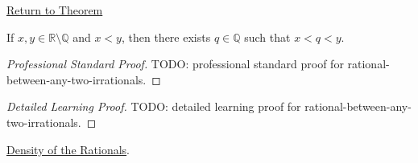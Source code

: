 \newpage
{}
\label{prf:rational-between-any-two-irrationals}

\begin{remark*}[Return]
\hyperref[thm:rational-between-any-two-irrationals]{Return to Theorem}
\end{remark*}

\begin{theorem*}
If $x,y\in\mathbb{R}\setminus\mathbb{Q}$ and $x<y$, then there exists
$q\in\mathbb{Q}$ such that $x<q<y$.
\end{theorem*}

\begin{proof}[Professional Standard Proof]
\LRAProofBodyStart
TODO: professional standard proof for rational-between-any-two-irrationals.
\end{proof}

\begin{proof}[Detailed Learning Proof]
\LRAProofBodyStart
TODO: detailed learning proof for rational-between-any-two-irrationals.
\end{proof}

\begin{remark*}
\end{remark*}

\begin{dependencies}
\hyperref[thm:density-of-rationals-in-reals]{Density of the Rationals}.
\end{dependencies}

\clearpage
